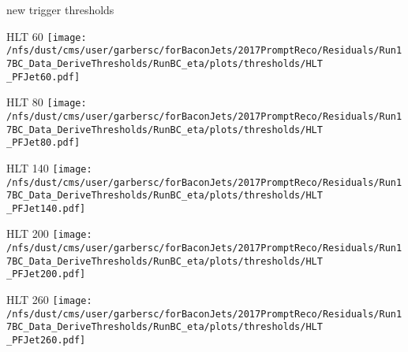 \documentclass[t,compress]{beamer}
\begin{document}
\begin{frame}{new trigger thresholds}
\begin{minipage}{0.19\textwidth}
\tiny HLT  60
 \newline
	\texttt{[image: /nfs/dust/cms/user/garbersc/forBaconJets/2017PromptReco/Residuals/Run17BC\_Data\_DeriveThresholds/RunBC\_eta/plots/thresholds/HLT\\\_PFJet60.pdf]}
\end{minipage}
\begin{minipage}{0.19\textwidth}
\tiny HLT  80
 \newline
	\texttt{[image: /nfs/dust/cms/user/garbersc/forBaconJets/2017PromptReco/Residuals/Run17BC\_Data\_DeriveThresholds/RunBC\_eta/plots/thresholds/HLT\\\_PFJet80.pdf]}
\end{minipage}
\begin{minipage}{0.19\textwidth}
\tiny HLT  140
 \newline
	\texttt{[image: /nfs/dust/cms/user/garbersc/forBaconJets/2017PromptReco/Residuals/Run17BC\_Data\_DeriveThresholds/RunBC\_eta/plots/thresholds/HLT\\\_PFJet140.pdf]}
\end{minipage}
\begin{minipage}{0.19\textwidth}
\tiny HLT  200
 \newline
	\texttt{[image: /nfs/dust/cms/user/garbersc/forBaconJets/2017PromptReco/Residuals/Run17BC\_Data\_DeriveThresholds/RunBC\_eta/plots/thresholds/HLT\\\_PFJet200.pdf]}
\end{minipage}
\begin{minipage}{0.19\textwidth}
\tiny HLT  260
 \newline
	\texttt{[image: /nfs/dust/cms/user/garbersc/forBaconJets/2017PromptReco/Residuals/Run17BC\_Data\_DeriveThresholds/RunBC\_eta/plots/thresholds/HLT\\\_PFJet260.pdf]}
\end{minipage}
\newline


\end{frame}
\end{document}
